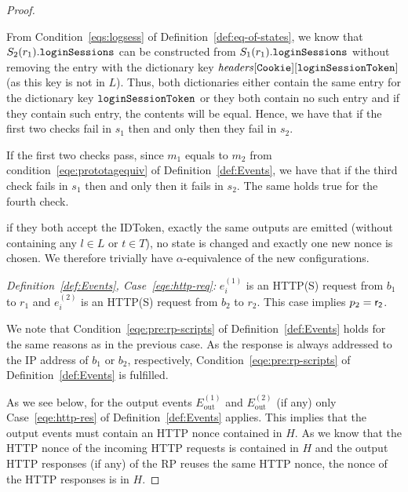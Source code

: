 \begin{theorem}
\begin{proof}
\begin{itemize}
        From Condition~\ref{eqs:logsess} of
        Definition~\ref{def:eq-of-states}, we know that
        $S_2(r_1).\mathtt{loginSessions}$ can be constructed from
        $S_1(r_1).\mathtt{loginSessions}$ without removing the 
        entry with the dictionary key 
        $\mathit{headers}[\mathtt{Cookie}][\mathtt{loginSessionToken}]$ 
        (as this key is not in $L$). Thus, both dictionaries 
        either contain the same entry for the dictionary key
        $\mathtt{loginSessionToken}$ or they both contain no
        such entry and if they contain such entry, the contents
        will be equal. Hence, we have that if the first two 
        checks fail in $s_1$ then and only then they fail in $s_2$.
  
        If the first two checks pass, since $m_1$ equals to $m_2$ 
        from condition~\ref{eqe:prototagequiv} of 
        Definition~\ref{def:Events}, we have that if the third 
        check fails in $s_1$ then and only then it fails in $s_2$. 
        The same holds true for the fourth check.
  
        if they both accept the IDToken, exactly the 
        same outputs are emitted (without containing any 
        $l\in L$ or $t \in T$), no state is changed and exactly 
        one new nonce is chosen. We therefore trivially have
        $\alpha$-equivalence of the new configurations.
    \end{itemize}
  
    \noindent \emph{Definition~\ref{def:Events}, Case~\ref{eqe:http-req}:} 
    $e_i^{(1)}$ is an HTTP(S) request from $b_1$ to $r_1$ and 
    $e_i^{(2)}$ is an HTTP(S) request from $b_2$ to $r_2$. 
    This case implies $p_2 = \mathsf{r_2}$.
  
    We note that Condition~\ref{eqe:pre:rp-scripts} of 
    Definition~\ref{def:Events} holds for the same reasons as in
    the previous case. As the response is always addressed to 
    the IP address of $b_1$ or $b_2$, respectively,
    Condition~\ref{eqe:pre:rp-scripts} of
    Definition~\ref{def:Events} is fulfilled. 
  
    As we see below, for the output events $E^{(1)}_\text{out}$ 
    and $E^{(2)}_\text{out}$ (if any) only Case~\ref{eqe:http-res} 
    of Definition~\ref{def:Events} applies. This implies that the
    output events must contain an HTTP nonce contained in $H$. As 
    we know that the HTTP nonce of the incoming HTTP requests is 
    contained in $H$ and the output HTTP responses (if any) of the 
    RP reuses the same HTTP nonce, the nonce of the HTTP responses 
    is in $H$.
  

\end{proof}
\end{theorem}
